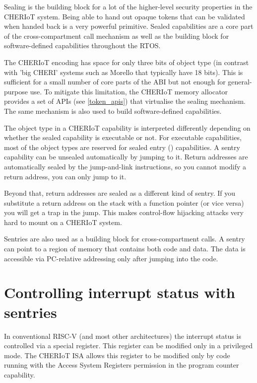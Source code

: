 Sealing is the building block for a lot of the higher-level security properties in the CHERIoT system.
Being able to hand out opaque tokens that can be validated when handed back is a very powerful primitive.
Sealed capabilities are a core part of the cross-compartment call mechanism as well as the building block for software-defined capabilities throughout the RTOS.

The CHERIoT encoding has space for only three bits of object type (in contrast with 'big CHERI' systems such as Morello that typically have 18 bits).
This is sufficient for a small number of core parts of the ABI but not enough for general-purpose use.
To mitigate this limitation, the CHERIoT memory allocator provides a set of APIs (see \ref{token_apis}) that virtualise the sealing mechanism.
The same mechanism is also used to build software-defined capabilities.

The object type in a CHERIoT capability is interpreted differently depending on whether the sealed capability is executable or not.
For executable capabilities, most of the object types are reserved for sealed entry () capabilities.
A sentry capability can be unsealed automatically by jumping to it.
Return addresses are automatically sealed by the jump-and-link instructions, so you cannot modify a return address, you can only jump to it.

Beyond that, return addresses are sealed as a different kind of sentry.
If you substitute a return address on the stack with a function pointer (or vice versa) you will get a trap in the jump.
This makes control-flow hijacking attacks very hard to mount on a CHERIoT system.

Sentries are also used as a building block for cross-compartment calls.
A sentry can point to a region of memory that contains both code and data.
The data is accessible via PC-relative addressing only after jumping into the code.

\section[label=interrupt_sentries]{Controlling interrupt status with sentries}

In conventional RISC-V (and most other architectures) the interrupt status is controlled via a special register.
This register can be modified only in a privileged mode.
The CHERIoT ISA allows this register to be modified only by code running with the Access System Registers permission in the program counter capability.

